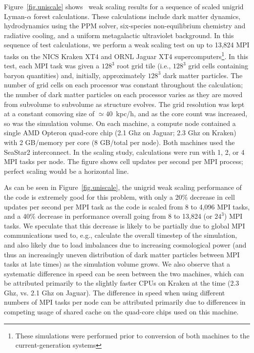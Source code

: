 Figure~\ref{fig.uniscale} shows \enzo\ weak scaling results for a
sequence of scaled unigrid Lyman-$\alpha$ forest calculations. These
calculations include dark matter dynamics, hydrodynamics using the
PPM solver, six-species non-equilibrium chemistry and
radiative cooling, and a uniform metagalactic ultraviolet background.
In this sequence of test calculations, we perform a weak scaling test
on up to 13,824 MPI tasks on the NICS Kraken XT4 and ORNL Jaguar XT4
supercomputers\footnote{These simulations were performed prior to
conversion of both machines to the current-generation systems}.  In
this test, each MPI task was given a $128^3$ root grid tile (i.e.,
$128^3$ grid cells containing baryon quantities) and, initially,
approximately $128^3$ dark matter particles.  The number of grid cells
on each processor 
was constant throughout the calculation; the number of dark matter
particles on each processor varies as they are moved from subvolume to subvolume as
structure evolves.  The grid resolution was kept at a constant
comoving size of $\simeq 40$~kpc/h, and as the core count was
increased, so was the simulation volume.  On each machine, a compute
node contained a single AMD Opteron quad-core chip (2.1 Ghz on Jaguar;
2.3 Ghz on Kraken) with 2 GB/memory per core (8 GB/total per node).
Both machines used the SeaStar2 interconnect.  In the scaling study,
calculations were run with 1, 2, or 4 MPI tasks per node.  The figure
shows cell updates per second per MPI process; perfect scaling would
be a horizontal line.

As can be seen in Figure~\ref{fig.uniscale}, the unigrid weak scaling
performance of the code is extremely good for this problem, with only
a 20\% decrease in cell updates per second per MPI task as the code is scaled from
8 to 4,096 MPI tasks, and a 40\% decrease in performance overall going
from 8 to 13,824 (or $24^3$) MPI tasks.  We speculate that this
decrease is likely to be partially due to global MPI communications
used to, e.g., calculate the overall timestep of the simulation, and
also likely due to load imbalances due to increasing cosmological
power (and thus an increasingly uneven distribution of dark matter
particles between MPI tasks at late times) as the simulation volume
grows.  We also observe that a systematic difference in speed can be
seen between the two machines, which can be attributed primarily to
the slightly faster CPUs on Kraken at the time (2.3 Ghz, vs. 2.1 Ghz
on Jaguar).  The difference in speed when using different numbers of
MPI tasks per node can be attributed primarily due to differences in
competing usage of shared cache on the quad-core chips used on this
machine.

